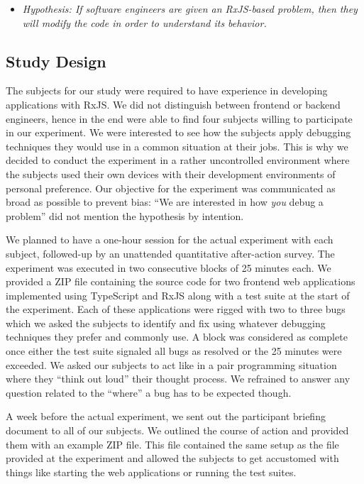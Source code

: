 \documentclass[12pt,a4paper]{article}
\begin{document}
\begin{itemize}
	\item \emph{Hypothesis: If software engineers are given an RxJS-based problem, then they will modify the code in order to understand its behavior.}
\end{itemize}

\subsection{Study Design}

The subjects for our study were required to have experience in developing applications with RxJS. We did not distinguish between frontend or backend engineers, hence in the end were able to find four subjects willing to participate in our experiment. We were interested to see how the subjects apply debugging techniques they would use in a common situation at their jobs. This is why we decided to conduct the experiment in a rather uncontrolled environment where the subjects used their own devices with their development environments of personal preference. Our objective for the experiment was communicated as broad as possible to prevent bias: ``We are interested in how \emph{you} debug a problem'' did not mention the hypothesis by intention.

We planned to have a one-hour session for the actual experiment with each subject, followed-up by an unattended quantitative after-action survey. The experiment was executed in two consecutive blocks of 25 minutes each. We provided a ZIP file containing the source code for two frontend web applications implemented using TypeScript and RxJS along with a test suite at the start of the experiment. Each of these applications were rigged with two to three bugs which we asked the subjects to identify and fix using whatever debugging techniques they prefer and commonly use. A block was considered as complete once either the test suite signaled all bugs as resolved or the 25 minutes were exceeded. We asked our subjects to act like in a pair programming situation where they ``think out loud'' their thought process. We refrained to answer any question related to the ``where'' a bug has to be expected though.

A week before the actual experiment, we sent out the participant briefing document to all of our subjects. We outlined the course of action and provided them with an example ZIP file. This file contained the same setup as the file provided at the experiment and allowed the subjects to get accustomed with things like starting the web applications or running the test suites.
\end{document}

